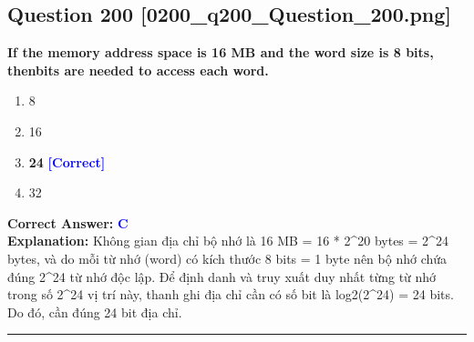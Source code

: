 \documentclass[11pt,a4paper]{article}
\begin{document}
\begin{minipage}{\textwidth}
\subsection*{Question 200 \quad \footnotesize{[0200\_q200\_Question\_200.png]}}
\noindent \textbf{If the memory address space is 16 MB and the word size is 8 bits, thenbits are needed to access each word.}

\begin{enumerate}[label=\Alph*.]
    \item 8
    \item 16
    \item \textbf{24} \hfill \textcolor{blue}{\textbf{[Correct]}}
    \item 32
\end{enumerate}

\noindent \textbf{Correct Answer:} \textcolor{blue}{\textbf{C}} \\[2pt]
\noindent \textbf{Explanation:} Không gian địa chỉ bộ nhớ là 16 MB = 16 * 2\textasciicircum{}20 bytes = 2\textasciicircum{}24 bytes, và do mỗi từ nhớ (word) có kích thước 8 bits = 1 byte nên bộ nhớ chứa đúng 2\textasciicircum{}24 từ nhớ độc lập. Để định danh và truy xuất duy nhất từng từ nhớ trong số 2\textasciicircum{}24 vị trí này, thanh ghi địa chỉ cần có số bit là log2(2\textasciicircum{}24) = 24 bits. Do đó, cần đúng 24 bit địa chỉ.

\par\vspace{0.3cm}
\hrule
\vspace{0.3cm}
\end{minipage}
\end{document}
